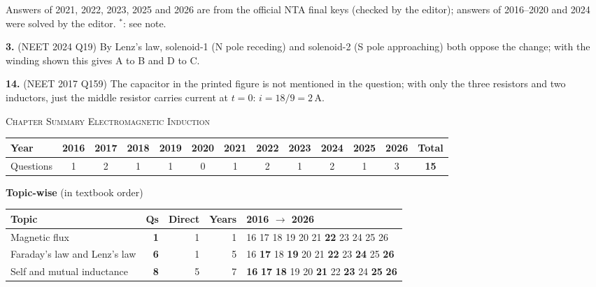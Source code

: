 {\footnotesize Answers of 2021, 2022, 2023, 2025 and 2026 are from the official NTA final keys (checked by the editor); answers of 2016--2020 and 2024 were solved by the editor. $^{*}$: see note.
\par\smallskip\textbf{3.} (NEET 2024 Q19) By Lenz's law, solenoid-1 (N pole receding) and solenoid-2 (S pole approaching) both oppose the change; with the winding shown this gives A to B and D to C.
\par\smallskip\textbf{14.} (NEET 2017 Q159) The capacitor in the printed figure is not mentioned in the question; with only the three resistors and two inductors, just the middle resistor carries current at $t=0$: $i=18/9=2$\,A.
}\par
\par{}\vspace{14pt}
\begin{center}{}\par
{\large\color{navy}\scshape Chapter Summary \textperiodcentered{} Electromagnetic Induction}\end{center}
{\small\setlength{\tabcolsep}{3.5pt}
\begin{tabular*}{\linewidth}{@{\extracolsep{\fill}}l*{11}{c}c@{}}\toprule
Year & 2016 & 2017 & 2018 & 2019 & 2020 & 2021 & 2022 & 2023 & 2024 & 2025 & 2026 & Total\\\midrule
Questions & 1 & 2 & 1 & 1 & 0 & 1 & 2 & 1 & 2 & 1 & 3 & \textbf{15}\\\bottomrule\end{tabular*}}\par\medskip
{\small\textbf{\color{crimson}Topic-wise} (in textbook order)\par\smallskip
\begin{tabularx}{\linewidth}{@{}>{\raggedright\arraybackslash}Xrrrl@{}}\toprule
Topic & Qs & Direct & Years & 2016 $\rightarrow$ 2026\\\midrule
Magnetic flux & \textbf{1} & 1 & 1 & {\scriptsize {\color{gray!45}16} {\color{gray!45}17} {\color{gray!45}18} {\color{gray!45}19} {\color{gray!45}20} {\color{gray!45}21} \textbf{22} {\color{gray!45}23} {\color{gray!45}24} {\color{gray!45}25} {\color{gray!45}26}}\\
Faraday's law and Lenz's law & \textbf{6} & 1 & 5 & {\scriptsize {\color{gray!45}16} \textbf{17} {\color{gray!45}18} \textbf{19} {\color{gray!45}20} {\color{gray!45}21} \textbf{22} {\color{gray!45}23} \textbf{24} {\color{gray!45}25} \textbf{26}}\\
Self and mutual inductance & \textbf{8} & 5 & 7 & {\scriptsize \textbf{16} \textbf{17} \textbf{18} {\color{gray!45}19} {\color{gray!45}20} \textbf{21} {\color{gray!45}22} \textbf{23} {\color{gray!45}24} \textbf{25} \textbf{26}}\\
\bottomrule\end{tabularx}}\par\medskip
